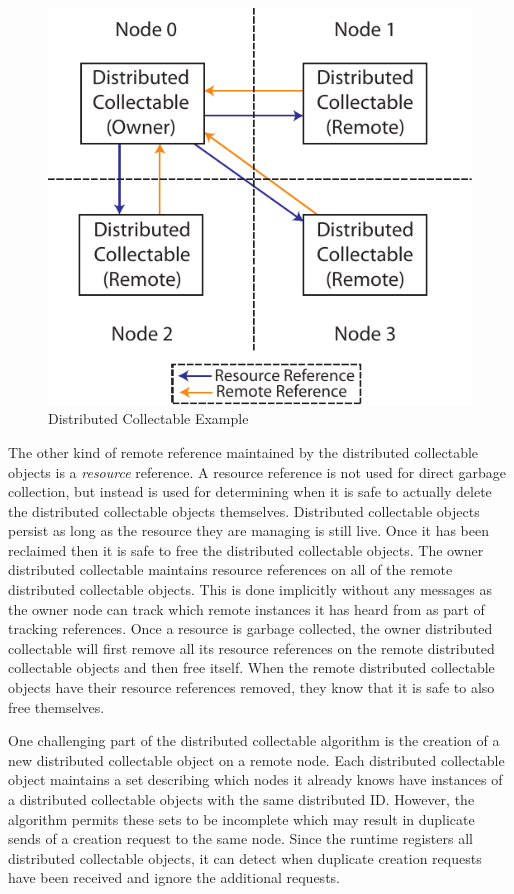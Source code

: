 \begin{figure}
\centering
\includegraphics[scale=0.9]{figs/DistributedCollectable.pdf}
\caption{Distributed Collectable Example\label{fig:distgc}}
\end{figure}

The other kind of remote reference maintained
by the distributed collectable objects is
a {\em resource} reference.  A resource
reference is not used for direct garbage
collection, but instead is used for determining
when it is safe to actually delete the 
distributed collectable objects themselves.
Distributed collectable objects persist as
long as the resource they are managing
is still live. Once it has been reclaimed
then it is safe to free the distributed
collectable objects. The owner distributed
collectable maintains resource references
on all of the remote distributed collectable
objects. This is done implicitly without any
messages as the owner node can track which
remote instances it has heard from as part
of tracking references. Once a resource is
garbage collected, the owner distributed
collectable will first remove all its
resource references on the remote distributed
collectable objects and then free itself.
When the remote distributed collectable 
objects have their resource references 
removed, they know that it is safe to 
also free themselves.

One challenging part of the distributed 
collectable algorithm is the creation of a
new distributed collectable object on a remote
node. Each distributed collectable object
maintains a set describing which nodes it
already knows have instances of a distributed
collectable objects with the same distributed ID.
However, the algorithm permits these sets to 
be incomplete which may result in duplicate
sends of a creation request to the same node.
Since the runtime registers all distributed
collectable objects, it can detect when 
duplicate creation requests have been received
and ignore the additional requests.

